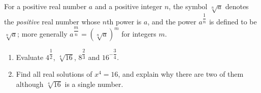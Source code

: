 For a positive real number $a$ and a positive integer $n$, the symbol $\sqrt[n]{a}$ denotes the \emph{positive} real number whose $n$th power is $a$, and the power $a^{\dfrac1n}$ is defined to be $\sqrt[n]{a}$; more generally $a^{\dfrac mn}=\left(\sqrt[n]{a}\right)^m$ for integers $m$.
\begin{enumerate}
\item[(a)] Evaluate $4^{\dfrac12}$, $\sqrt[4]{16}$, $8^{\dfrac23}$ and $16^{-\dfrac34}$.
\item[(b)] Find all real solutions of $x^4=16$, and explain why there are two of them although $\sqrt[4]{16}$ is a single number.
\end{enumerate}
